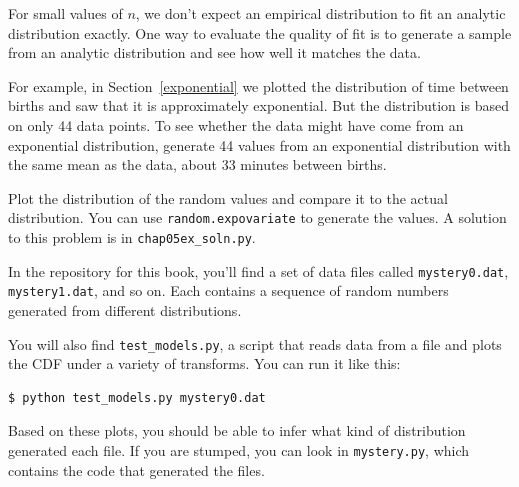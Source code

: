 \documentclass[12pt]{book}
\begin{document}
\begin{exercise}
For small values of $n$, we don't expect an empirical distribution
to fit an analytic distribution exactly.  One way to evaluate
the quality of fit is to generate a sample from an analytic
distribution and see how well it matches the data.

For example, in Section~\ref{exponential} we plotted the distribution
of time between births and saw that it is approximately exponential.
But the distribution is based on only 44 data points.  To see whether
the data might have come from an exponential distribution, generate 44
values from an exponential distribution with the same mean as the
data, about 33 minutes between births.

Plot the distribution of the random values and compare it to the
actual distribution.  You can use {\tt random.expovariate} 
to generate the values.  A solution to this problem is in
\verb"chap05ex_soln.py".

\end{exercise}


\begin{exercise}
In the repository for this book, you'll find a set of data files
called {\tt mystery0.dat}, {\tt mystery1.dat}, and so on.  Each
contains a sequence of random numbers generated from different
distributions.

You will also find \verb"test_models.py", a script that reads
data from a file and plots the CDF under a variety of transforms.
You can run it like this:

\begin{verbatim}
$ python test_models.py mystery0.dat
\end{verbatim}

Based on these plots, you should be able to infer what kind of
distribution generated each file.  If you are stumped, you can
look in {\tt mystery.py}, which contains the code that generated
the files.

\end{exercise}
\end{document}
